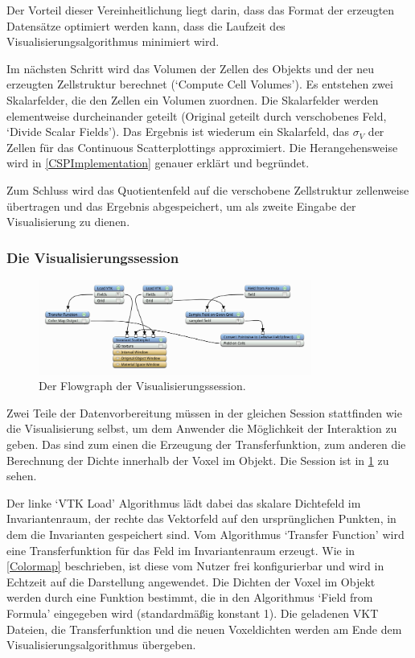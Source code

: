 \documentclass[a4paper,fontsize=12pt,toc=bib,halfparskip,ngerman]{scrartcl}
\begin{document}
Der Vorteil dieser Vereinheitlichung liegt darin, dass das Format der erzeugten Datens\"atze optimiert werden kann, dass die Laufzeit des Visualisierungsalgorithmus minimiert wird. 

Im n\"achsten Schritt wird das Volumen der Zellen des Objekts und der neu erzeugten Zellstruktur berechnet (`Compute Cell Volumes'). Es entstehen zwei Skalarfelder, die den Zellen ein Volumen zuordnen. Die Skalarfelder werden elementweise durcheinander geteilt (Original geteilt durch verschobenes Feld, `Divide Scalar Fields'). Das Ergebnis ist wiederum ein Skalarfeld, das $\sigma_V$ der Zellen f\"ur das Continuous Scatterplottings approximiert. Die Herangehensweise wird in \cref{CSPImplementation} genauer erkl\"art und begr\"undet.

Zum Schluss wird das Quotientenfeld auf die verschobene Zellstruktur zellenweise \"ubertragen und das Ergebnis abgespeichert, um als zweite Eingabe der Visualisierung zu dienen.

\subsubsection{Die Visualisierungssession}
\begin{figure}
	\centering
	\includegraphics[width=0.8\textwidth]{pictures/VisSession.png}
	\caption{Der Flowgraph der Visualisierungssession.}
	\label{VisualizationSession}
\end{figure}

Zwei Teile der Datenvorbereitung m\"ussen in der gleichen Session stattfinden wie die Visualisierung selbst, um dem Anwender die M\"oglichkeit der Interaktion zu geben. Das sind zum einen die Erzeugung der Transferfunktion, zum anderen die Berechnung der Dichte innerhalb der Voxel im Objekt. Die Session ist in \cref{VisualizationSession} zu sehen.

Der linke `VTK Load' Algorithmus l\"adt dabei das skalare Dichtefeld im Invariantenraum, der rechte das Vektorfeld auf den urspr\"unglichen Punkten, in dem die Invarianten gespeichert sind. Vom Algorithmus `Transfer Function' wird eine Transferfunktion f\"ur das Feld im Invariantenraum erzeugt. Wie in \cref{Colormap} beschrieben, ist diese vom Nutzer frei konfigurierbar und wird in Echtzeit auf die Darstellung angewendet. Die Dichten der Voxel im Objekt werden durch eine Funktion bestimmt, die in den Algorithmus `Field from Formula' eingegeben wird (standardm\"a{\ss}ig konstant 1). Die geladenen VKT Dateien, die Transferfunktion und die neuen Voxeldichten werden am Ende dem Visualisierungsalgorithmus \"ubergeben.
\end{document}
